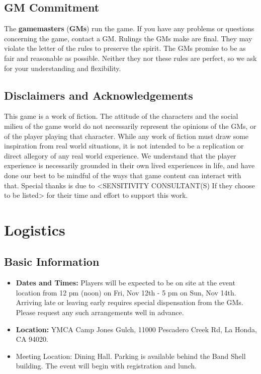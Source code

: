 \documentclass[sheet]{GL2020}
\begin{document}
\vfill

\subsection{GM Commitment}
The \textbf{gamemasters} (\textbf{GMs}) run the game. If you have any problems or questions concerning the game, contact a GM. Rulings the GMs make are final.  They may violate the letter of the rules to preserve the spirit.  The GMs promise to be as fair and reasonable as possible. Neither they nor these rules are perfect, so we ask for your understanding and flexibility.

\vfill

\subsection{Disclaimers and Acknowledgements}
This game is a work of fiction. The attitude of the characters and the social milieu of the game world do not necessarily represent the opinions of the GMs, or of the player playing that character. While any work of fiction must draw some inspiration from real world situations, it is not intended to be a replication or direct allegory of any real world experience. We understand that the player experience is necessarily grounded in their own lived experiences in life, and have done our best to be mindful of the ways that game content can interact with that. Special thanks is due to <SENSITIVITY CONSULTANT(S) If they choose to be listed> for their time and effort to support this work. 

\section{Logistics}
\subsection{Basic Information}
\begin{itemize}
  \item \textbf{Dates and Times:} Players will be expected to be on site at the event location from 12 pm (noon) on Fri, Nov 12th - 5 pm on Sun, Nov 14th. Arriving late or leaving early requires special dispensation from the GMs. Please request any such arrangements well in advance.
  \item \textbf{Location:} YMCA Camp Jones Gulch, 11000 Pescadero Creek Rd, La Honda, CA 94020.
  \item Meeting Location: Dining Hall. Parking is available behind the Band Shell building. The event will begin with registration and lunch.
\end{itemize}
\end{document}

